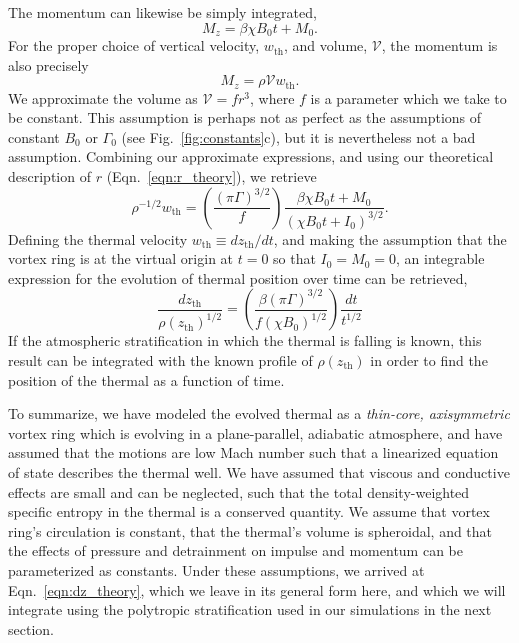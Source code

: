 \documentclass[twocolumn, amsmath, amsfonts, amssymb, trackchanges]{aastex62}
\begin{document}
The momentum can likewise be simply integrated,
\begin{equation*}
M_z = \beta\chi B_0 t + M_0.
\end{equation*}
For the proper choice of vertical velocity, $w_{\text{th}}$, and volume, $\mathcal{V}$, the momentum is also precisely 
\begin{equation*}
M_z = \rho \mathcal{V} w_{\text{th}}.
\end{equation*}
We approximate the volume as $\mathcal{V} = f r^3$, where $f$ is a parameter which we take to be constant. 
This assumption is perhaps not as perfect as the assumptions of constant $B_0$ or $\Gamma_0$ (see Fig.~\ref{fig:constants}c), but it is nevertheless not a bad assumption. 
Combining our approximate expressions, and using our theoretical description of $r$ (Eqn.~\ref{eqn:r_theory}), we retrieve
\begin{equation}
\rho^{-1/2} w_{\text{th}} = \left(\frac{(\pi \Gamma)^{3/2}}{f}\right)\frac{\beta\chi B_0 t + M_0}{(\chi B_0 t + I_0)^{3/2}}.
\end{equation}
Defining the thermal velocity $w_{\text{th}} \equiv dz_{\text{th}}/dt$, and making the assumption that the vortex ring is at the virtual origin at $t = 0$ so that $I_0 = M_0 = 0$, an integrable expression for the evolution of thermal position over time can be retrieved,
\begin{equation}
\frac{dz_{\text{th}}}{\rho(z_{\text{th}})^{1/2}} =
\left(\frac{\beta(\pi\Gamma)^{3/2}}{f(\chi B_0)^{1/2}}\right)\frac{dt}{t^{1/2}}
\label{eqn:dz_theory}
\end{equation}
If the atmospheric stratification in which the thermal is falling is known, this result can be integrated with the known profile of $\rho(z_{\text{th}})$ in order to find the position of the thermal as a function of time. 

To summarize, we have modeled the evolved thermal as a \emph{thin-core, axisymmetric} vortex ring which is evolving in a plane-parallel, adiabatic atmosphere, and have assumed that the motions are low Mach number such that a linearized equation of state describes the thermal well.
We have assumed that viscous and conductive effects are small and can be neglected, such that the total density-weighted specific entropy in the thermal is a conserved quantity.
We assume that vortex ring's circulation is constant, that the thermal's volume is spheroidal, and that the effects of pressure and detrainment on impulse and momentum can be parameterized as constants.
Under these assumptions, we arrived at Eqn.~\ref{eqn:dz_theory}, which we leave in its general form here, and which we will integrate using the polytropic stratification used in our simulations in the next section.
\end{document}
